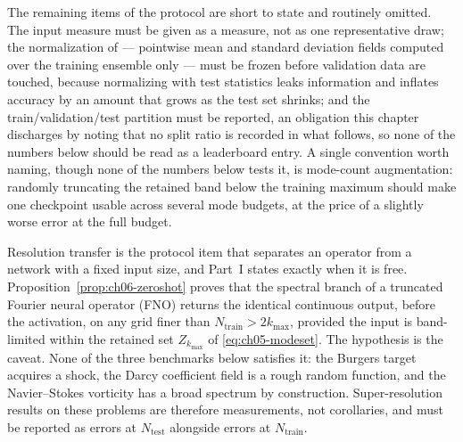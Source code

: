 The remaining items of the protocol are short to state and routinely omitted. The
input measure must be given as a measure, not as one representative draw; the
normalization of
 --- pointwise mean and
standard deviation fields computed over the training ensemble only --- must be
frozen before validation data are touched, because normalizing with test
statistics leaks information and inflates accuracy by an amount that grows as the
test set shrinks; and the train/validation/test partition must be reported, an
obligation this chapter discharges by noting that no split ratio is recorded in
what follows, so none of the numbers below should be read as a leaderboard entry.
A single convention worth naming, though none of the numbers below tests it, is
mode-count augmentation: randomly truncating
the retained band below the training maximum should make one checkpoint usable across
several mode budgets, at the price of a slightly worse error at the full budget.

Resolution transfer is the protocol item that separates an operator from a
network with a fixed input size, and Part~I states exactly when it is free.
Proposition~\ref{prop:ch06-zeroshot} proves that the spectral branch of a
truncated Fourier neural operator (FNO) returns the identical continuous output,
before the activation, on any grid finer than
$N_{\text{train}} > 2k_{\max}$, provided the input is band-limited within the
retained set $Z_{k_{\max}}$ of \eqref{eq:ch05-modeset}. The hypothesis is the
caveat. None of the three benchmarks below satisfies it: the Burgers target
acquires a shock, the Darcy coefficient field is a rough random function, and the
Navier--Stokes vorticity has a broad spectrum by construction. Super-resolution
results on these problems are therefore measurements, not corollaries, and must be
reported as errors at $N_{\text{test}}$ alongside errors at $N_{\text{train}}$.

